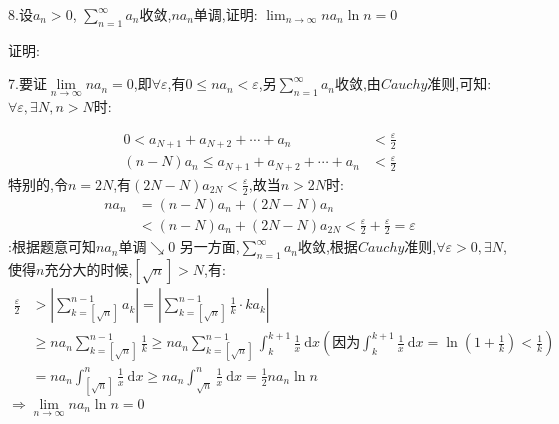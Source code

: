 \documentclass{ctexart}
\begin{document}
   \begin{tcolorbox}[title = {综合性问题},colbacktitle=red!25!white,colback=white,arc = 2mm, outer arc = 2mm,fonttitle = \itshape, fontupper = \itshape, fontlower = \itshape]
   		8.设$a_{n} > 0$, $\sum\limits_{n=1}^{\infty}a_{n}$收敛,$na_{n}$单调,证明:
   	$\displaystyle{\lim_{n \to \infty}na_{n}\ln n =0}$
   	\begin{tcolorbox}[colback=white,arc = 1mm, outer arc = 1mm,fonttitle = \itshape, fontupper = \itshape, fontlower = \itshape]
   		{\color{red}证明:}
   		
   		7.要证$\lim\limits_{n \to \infty}na_{n}=0$,即$\forall \varepsilon$,有$0 \le na_{n} < \varepsilon$,另$\displaystyle{\sum_{n=1}^{\infty}a_{n}}$收敛,由$Cauchy$准则,可知: $\forall \varepsilon,\exists N,n>N$时:
   		
   		$$
   		\begin{aligned}
   			0 < a_{N+1}+a_{N+2}+\cdots+a_{n}& <\frac{\varepsilon}{2}\\
   			\left(n-N\right)a_{n} \le a_{N+1}+a_{N+2}+\cdots+a_{n}& <\frac{\varepsilon}{2}
   		\end{aligned}
   		$$
   		特别的,令$n=2N$,有$\left(2N-N\right)a_{2N} < \frac{\varepsilon}{2}$,故当$n>2N$时:
   		$$
   		\begin{aligned}
   			na_{n} & = \left(n-N \right)a_{n}+\left(2N-N\right)a_{n} \\
   			& < \left(n-N \right)a_{n}+\left(2N-N\right)a_{2N}<\frac{\varepsilon}{2}+\frac{\varepsilon}{2}=\varepsilon
   		\end{aligned}
   		$$
   		:根据题意可知$na_{n}$单调$\searrow 0$
   		另一方面,$\sum\limits_{n=1}^{\infty}a_{n}$收敛,根据$Cauchy$准则,$\forall \varepsilon > 0,\exists N$,使得$n$充分大的时候,$[\sqrt{n}] > N$,有:
   		   		$$
   		\begin{aligned}
   			\frac{\varepsilon}{2} &>\left|\sum_{k=[\sqrt{n}]}^{n-1} a_{k}\right|=\left|\sum_{k=[\sqrt{n}]}^{n-1} \frac{1}{k} \cdot k a_{k}\right| \\
   			& \ge na_{n} \sum_{k=[\sqrt{n}]}^{n-1} \frac{1}{k} \ge n a_{n} \sum_{k=[\sqrt{n}]}^{n-1} \int_{k}^{k+1} \frac{1}{x} \mathrm{~d} x \left({\text{因为}}\int_{k}^{k+1} \frac{1}{x} \mathrm{~d} x=\ln\left(1+\frac{1}{k} \right)< \frac{1}{k} \right)  \\
   			&=n a_{n} \int_{[\sqrt{n}]}^{n} \frac{1}{x} \mathrm{~d} x \ge n a_{n} \int_{\sqrt{n}}^{n} \frac{1}{x} \mathrm{~d} x=\frac{1}{2} n a_{n} \ln n
   		\end{aligned}
   		$$
   		$\Rightarrow \lim\limits_{n \to \infty}na_{n}\ln n =0 $		
   	\end{tcolorbox}
   	\begin{tcolorbox}[title = {类似},colbacktitle=green!35!black,colback=white,arc = 3mm, outer arc = 3mm,fonttitle = \itshape, fontupper = \itshape, fontlower = \itshape]


\end{tcolorbox}
\end{tcolorbox}
\end{document}
